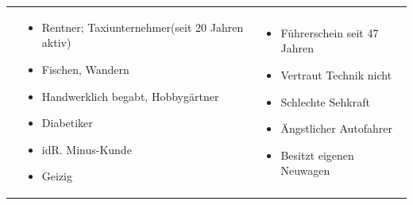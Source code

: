 \begin{center}
\begin{tabular}{| p{} | p{} | p{} |}
\begin{itemize}
		\end{itemize}
		&
		\begin{itemize}
			\item Rentner; Taxiunternehmer(seit 20 Jahren aktiv)
			\item Fischen, Wandern
			\item Handwerklich begabt, Hobbygärtner 
			\item Diabetiker
			\item idR. Minus-Kunde
			\item Geizig
		\end{itemize}	
		& 
		\begin{itemize}
			\item Führerschein seit 47 Jahren
			\item Vertraut Technik nicht
			\item Schlechte Sehkraft
			\item Ängstlicher Autofahrer
			\item Besitzt eigenen Neuwagen
		\end{itemize}
		\\ [0.5ex]
	

\end{tabular}
\end{center}
